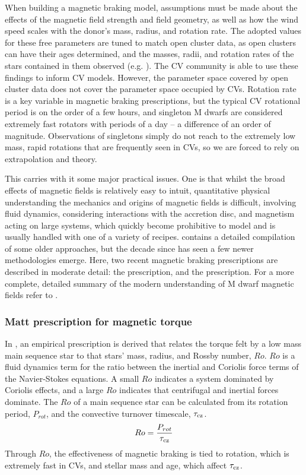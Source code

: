 When building a magnetic braking model, assumptions must be made about the effects of the magnetic field strength and field geometry, as well as how the wind speed scales with the donor's mass, radius, and rotation rate. The adopted values for these free parameters are tuned to match open cluster data, as open clusters can have their ages determined, and the masses, radii, and rotation rates of the stars contained in them observed (e.g. \citealt{matt2015,garraffo2018a}). The CV community is able to use these findings to inform CV models.
However, the parameter space covered by open cluster data does not cover the parameter space occupied by CVs. Rotation rate is a key variable in magnetic braking prescriptions, but the typical CV rotational period is on the order of a few hours, and singleton M dwarfs are considered extremely fast rotators with periods of a day -- a difference of an order of magnitude. Observations of singletons simply do not reach to the extremely low mass, rapid rotations that are frequently seen in CVs, so we are forced to rely on extrapolation and theory.

This carries with it some major practical issues. One is that whilst the broad effects of magnetic fields is relatively easy to intuit, quantitative physical understanding the mechanics and origins of magnetic fields is difficult, involving fluid dynamics, considering interactions with the accretion disc, and magnetism acting on large systems, which quickly become prohibitive to model and is usually handled with one of a variety of recipes. \citealt{knigge11} contains a detailed compilation of some older approaches, but the decade since has seen a few newer methodologies emerge. Here, two recent magnetic braking prescriptions are described in moderate detail: the \citet{matt2015} prescription, and the \citet{garraffo2018a} prescription. For a more complete, detailed summary of the modern understanding of M dwarf magnetic fields refer to \citet{kochukhov2021}.


\subsubsection{Matt prescription for magnetic torque}
\label{sect:introduction:matt braking}

In \citet{matt2015}, an empirical prescription is derived that relates the torque felt by a low mass main sequence star to that stars' mass, radius, and Rossby number, $Ro$. $Ro$ is a fluid dynamics term for the ratio between the inertial and Coriolis force terms of the Navier-Stokes equations. A small $Ro$ indicates a system dominated by Coriolis effects, and a large $Ro$ indicates that centrifugal and inertial forces dominate. The $Ro$ of a main sequence star can be calculated from its rotation period, $P_{rot}$, and the convective turnover timescale, $\tau_{\rm cz}$.
\begin{equation}
    \label{eqn:introduction:rossby number}
    {Ro} = \frac{P_{rot}}{\tau_{\rm cz}}
\end{equation}
Through $Ro$, the effectiveness of magnetic braking is tied to rotation, which is extremely fast in CVs, and stellar mass and age, which affect $\tau_{\rm cz}$.

